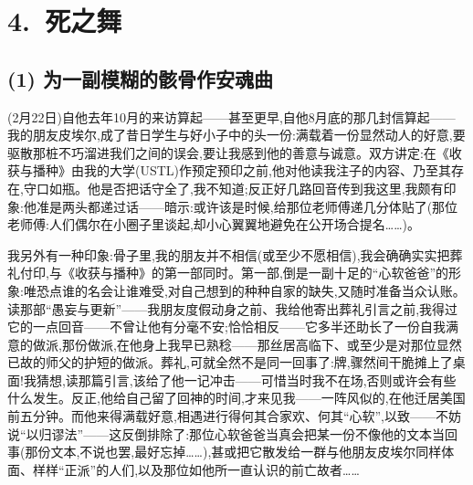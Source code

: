 \section{4.~死之舞}

\subsection{(1) 为一副模糊的骸骨作安魂曲}


(2月22日)自他去年10月的来访算起——甚至更早,自他8月底的那几封信算起——我的朋友皮埃尔,成了昔日学生与好小子中的头一份:满载着一份显然动人的好意,要驱散那桩不巧溜进我们之间的误会,要让我感到他的善意与诚意。双方讲定:在《收获与播种》由我的大学(USTL)作预定预印之前,他对他读我注子的内容、乃至其存在,守口如瓶。他是否把话守全了,我不知道;反正好几路回音传到我这里,我颇有印象:他准是两头都递过话——暗示:或许该是时候,给那位老师傅递几分体贴了(那位老师傅:人们偶尔在小圈子里谈起,却小心翼翼地避免在公开场合提名……)。

我另外有一种印象:骨子里,我的朋友并不相信(或至少不愿相信),我会\dmark{}确确实实把葬礼付印,与《收获与播种》的第一部同时。第一部,倒是一副十足的“心软爸爸”的形象:唯恐点谁的名会让谁难受,对自己想到的种种自家的缺失,又随时准备当众认账。读那部“愚妄与更新”——我朋友度假动身之前、我给他寄出葬礼引言之前,我得过它的一点回音——不曾让他有分毫不安;恰恰相反——它多半还助长了一份自我满意的做派,那份做派,在他身上我早已熟稔——那丝居高临下、或至少是对那位显然已故的师父的护短的做派。葬礼,可就全然不是同一回事了:牌,骤然间干脆摊上了桌面!我猜想,读那篇引言,该给了他一记冲击——可惜当时我不在场,否则或许会有些什么发生。反正,他给自己留了回神的时间,才来见我——一阵风似的,在他迁居美国前五分钟。而他来得满载好意,相遇进行得何其合家欢、何其“心软”,以致——不妨说“以归谬法”——这反倒排除了:那位心软爸爸当真会把某一份不像他的文本当回事(那份文本,不说也罢,最好忘掉……),甚或把它散发给一群与他朋友皮埃尔同样体面、样样“正派”的人们,以及那位如他所一直认识的前亡故者……

